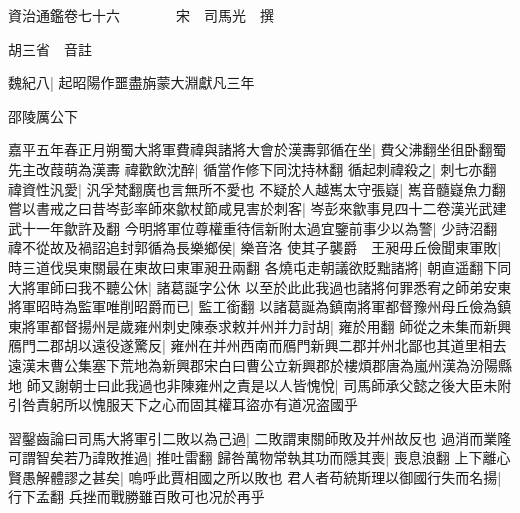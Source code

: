 資治通鑑卷七十六　　　　宋　司馬光　撰

胡三省　音註

魏紀八|{
	起昭陽作噩盡旃蒙大淵獻凡三年}


邵陵厲公下

嘉平五年春正月朔蜀大將軍費禕與諸將大會於漢夀郭循在坐|{
	費父沸翻坐徂卧翻蜀先主改葭萌為漢夀}
禕歡飲沈醉|{
	循當作修下同沈持林翻}
循起刺禕殺之|{
	刺七亦翻}
禕資性汎愛|{
	汎孚梵翻廣也言無所不愛也}
不疑於人越嶲太守張嶷|{
	嶲音髓嶷魚力翻}
嘗以書戒之曰昔岑彭率師來歙杖節咸見害於刺客|{
	岑彭來歙事見四十二卷漢光武建武十一年歙許及翻}
今明將軍位尊權重待信新附太過宜鑒前事少以為警|{
	少詩沼翻}
禕不從故及禍詔追封郭循為長樂鄉侯|{
	樂音洛}
使其子襲爵　王昶毋丘儉聞東軍敗|{
	時三道伐吳東關最在東故曰東軍昶丑兩翻}
各燒屯走朝議欲貶黜諸將|{
	朝直遥翻下同}
大將軍師曰我不聽公休|{
	諸葛誕字公休}
以至於此此我過也諸將何罪悉宥之師弟安東將軍昭時為監軍唯削昭爵而已|{
	監工銜翻}
以諸葛誕為鎮南將軍都督豫州母丘儉為鎮東將軍都督揚州是歲雍州刺史陳泰求敕并州并力討胡|{
	雍於用翻}
師從之未集而新興鴈門二郡胡以遠役遂驚反|{
	雍州在并州西南而鴈門新興二郡并州北鄙也其道里相去遠漢末曹公集塞下荒地為新興郡宋白曰曹公立新興郡於樓煩郡唐為嵐州漢為汾陽縣地}
師又謝朝士曰此我過也非陳雍州之責是以人皆愧悅|{
	司馬師承父懿之後大臣未附引咎責躬所以愧服天下之心而固其權耳盜亦有道况盗國乎}


習鑿齒論曰司馬大將軍引二敗以為己過|{
	二敗謂東關師敗及并州故反也}
過消而業隆可謂智矣若乃諱敗推過|{
	推吐雷翻}
歸咎萬物常執其功而隱其喪|{
	喪息浪翻}
上下離心賢愚解體謬之甚矣|{
	嗚呼此賈相國之所以敗也}
君人者苟統斯理以御國行失而名揚|{
	行下孟翻}
兵挫而戰勝雖百敗可也况於再乎


